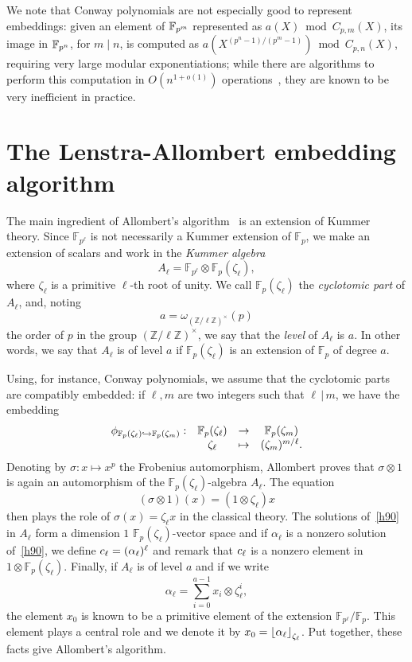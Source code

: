 \documentclass{sig-alternate}
\begin{document}
We note that Conway polynomials are not especially good to represent
embeddings: given an element of $\mathbb{F}_{p^m}$ represented as
$a(X) \bmod C_{p,m}(X)$, its image in $\mathbb{F}_{p^n}$, for $m\mid n$, is
computed as $a(X^{(p^n-1)/(p^m-1)})\bmod C_{p,n}(X)$, requiring very
large modular exponentiations; while there are algorithms to perform
this computation in $O(n^{1+o(1)})$ operations~\cite{KeUm11}, they are
known to be very inefficient in practice. %


\section{The Lenstra-Allombert embedding algorithm}
\label{sec:lenstra}
\cite{LenstraJr91}\cite{brieulle2018computing}


The main ingredient of Allombert's algorithm~\cite{Allombert02} is an extension
of Kummer theory. Since $\mathbb{F}_{p^\ell}$ is not necessarily a Kummer
extension of $\mathbb{F}_p$, we make an extension of scalars and work in the
\emph{Kummer algebra}
\[
  A_\ell = \mathbb{F}_{p^\ell}\otimes\mathbb{F}_{p}(\zeta_\ell),
\]
where $\zeta_\ell$ is a primitive $\ell$-th root of unity. We
call $\mathbb{F}_{p}(\zeta_\ell)$ the \emph{cyclotomic part} of $A_\ell$, and,
noting
\[
  a = \omega_{(\mathbb{Z}/\ell\mathbb{Z})^\times}(p)
\]
the order of $p$ in the group $(\mathbb{Z}/\ell\mathbb{Z})^\times$,
we say that the \emph{level} of $A_\ell$ is $a$. In other words, we say that
$A_\ell$ is of level $a$ if $\mathbb{F}_{p}(\zeta_\ell)$ is an extension of
$\mathbb{F}_p$ of degree $a$.

Using, for instance,
Conway polynomials, we assume that the cyclotomic parts are compatibly embedded: if
$\ell, m$ are two integers such that $\ell\,|\,m$, we have the embedding
\[
\begin{array}{cccc}
  \phi_{\mathbb{F}_{p}(\zeta_{\ell})\hookrightarrow\mathbb{F}_{p}(\zeta_{m})}: & \mathbb{F}_{p}(\zeta_\ell) & \to & \mathbb{F}_{p}(\zeta_m) \\
  & \zeta_\ell & \mapsto & (\zeta_{m})^{m/\ell}.
\end{array}
\]
Denoting by $\sigma:x\mapsto x^p$ the Frobenius automorphism, Allombert proves that
$\sigma\otimes1$ is again an automorphism of the
$\mathbb{F}_{p}(\zeta_\ell)$-algebra $A_\ell$. The equation
\begin{equation}
  \tag{H90}
 (\sigma\otimes1)(x) = (1\otimes\zeta_\ell)x
  \label{h90}
\end{equation}
then plays the role of $\sigma(x)=\zeta_\ell x$ in the classical theory. The
solutions of~\eqref{h90} in $A_\ell$ form a dimension $1$
$\mathbb{F}_{p}(\zeta_{\ell})$-vector space and if $\alpha_\ell$ is a
nonzero solution
of~\eqref{h90}, we define $c_\ell = (\alpha_\ell)^\ell$ and remark that
$c_\ell$ is a nonzero element in $1\otimes\mathbb{F}_{p}(\zeta_\ell)$. Finally,
if $A_\ell$ is of level $a$ and if we write
\[
  \alpha_\ell = \sum_{i =  0}^{a-1}x_i\otimes\zeta_{\ell}^i,
\]
the element $x_0$ is known to be a primitive element of the extension
$\mathbb{F}_{p^\ell}/\mathbb{F}_{p}$. This element plays a central role and we
denote it by $x_0 = \left\lfloor \alpha_\ell \right\rfloor_{\zeta_\ell}$. Put together, these facts give Allombert's
algorithm.
\end{document}
